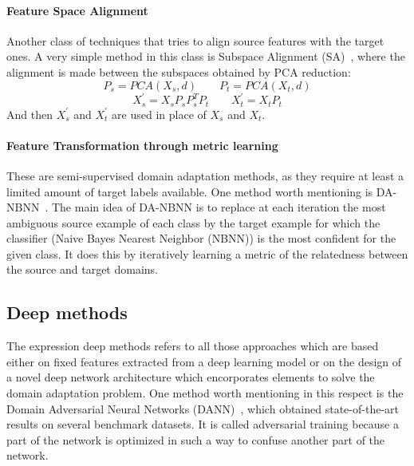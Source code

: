\documentclass[../main.tex]{subfiles}
\begin{document}
	\paragraph{Feature Space Alignment}
	Another class of techniques that tries to align source features with the target ones. A very simple method in this class is
	Subspace Alignment (SA)~\cite{subspace-alignment}, where the alignment is made between the subspaces obtained by PCA reduction:
	$$ P_{s} = PCA(X_{s}, d) \qquad P_{t} = PCA(X_{t}, d) $$
	$$ X_{s}^{'} = X_{s}P_{s}P_{s}^{T}P_{t} \qquad X_{t}^{'} = X_{t} P_{t} $$
	And then $X_{s}^{'}$ and $X_{t}^{'}$ are used in place of $X_{s}$ and $X_{t}$.

	\paragraph{Feature Transformation through metric learning}
	These are semi-supervised domain adaptation methods, as they require at least a limited amount of target labels available.
	One method worth mentioning is DA-NBNN~\cite{da-nbnn}. The main idea of DA-NBNN is to replace at each iteration the most ambiguous
	source example of each class by the target example for which the classifier (Naive Bayes Nearest Neighbor (NBNN)) is the
	most confident for the given class. It does this by iteratively learning a metric of the relatedness between the source and
	target domains.

    \subsection{Deep methods}
	The expression deep methods refers to all those approaches which are based either on fixed features extracted from a deep learning
    model or on the design of a novel deep network architecture which encorporates elements to solve the domain adaptation problem.
    One method worth mentioning in this respect is the Domain Adversarial Neural Networks (DANN)~\cite{DANN}, which obtained state-of-the-art
    results on several benchmark datasets. It is called adversarial training because a part of the network is optimized in such a way
    to confuse another part of the network.
\end{document}
